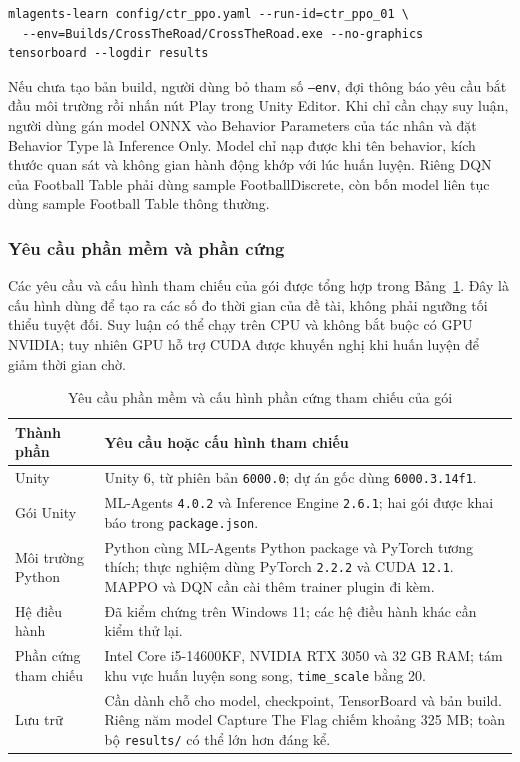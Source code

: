 \begin{lstlisting}[caption={Lệnh mẫu huấn luyện môi trường Cross The Road}]
mlagents-learn config/ctr_ppo.yaml --run-id=ctr_ppo_01 \
  --env=Builds/CrossTheRoad/CrossTheRoad.exe --no-graphics
tensorboard --logdir results
\end{lstlisting}

\indent Nếu chưa tạo bản build, người dùng bỏ tham số \texttt{--env}, đợi thông báo yêu
cầu bắt đầu môi trường rồi nhấn nút Play trong Unity Editor. Khi chỉ cần chạy suy luận,
người dùng gán model ONNX vào Behavior Parameters của tác nhân và đặt
Behavior Type là Inference Only. Model chỉ nạp được khi tên behavior,
kích thước quan sát và không gian hành động khớp với lúc huấn luyện. Riêng DQN của
Football Table phải dùng sample FootballDiscrete, còn bốn model liên tục dùng
sample Football Table thông thường.

\subsubsection{Yêu cầu phần mềm và phần cứng}
\label{subsub:pkg-requirements}

\indent Các yêu cầu và cấu hình tham chiếu của gói được tổng hợp trong
Bảng~\ref{tab:pkg_requirements}. Đây là cấu hình dùng để tạo ra các số đo thời gian của
đề tài, không phải ngưỡng tối thiểu tuyệt đối. Suy luận có thể chạy trên CPU và không bắt
buộc có GPU NVIDIA; tuy nhiên GPU hỗ trợ CUDA được khuyến nghị khi huấn luyện để giảm thời
gian chờ.

\begin{table}[H]
\centering
\caption{Yêu cầu phần mềm và cấu hình phần cứng tham chiếu của gói}
\label{tab:pkg_requirements}
\renewcommand{\arraystretch}{1.3}
\tablefont
\begin{tabular}{|p{3.7cm}|>{\raggedright\arraybackslash}p{9.8cm}|}
\hline
\textbf{Thành phần} & \textbf{Yêu cầu hoặc cấu hình tham chiếu} \\
\hline
Unity & Unity 6, từ phiên bản \texttt{6000.0}; dự án gốc dùng
\texttt{6000.3.14f1}. \\
\hline
Gói Unity & ML-Agents \texttt{4.0.2} và Inference Engine \texttt{2.6.1}; hai gói được
khai báo trong \texttt{package.json}. \\
\hline
Môi trường Python & Python cùng ML-Agents Python package và PyTorch tương thích; thực
nghiệm dùng PyTorch \texttt{2.2.2} và CUDA \texttt{12.1}. MAPPO và DQN cần cài thêm
trainer plugin đi kèm. \\
\hline
Hệ điều hành & Đã kiểm chứng trên Windows 11; các hệ điều hành khác cần kiểm thử lại. \\
\hline
Phần cứng tham chiếu & Intel Core i5-14600KF, NVIDIA RTX 3050 và 32 GB RAM; tám khu vực
huấn luyện song song, \texttt{time\_scale} bằng 20. \\
\hline
Lưu trữ & Cần dành chỗ cho model, checkpoint, TensorBoard và bản build. Riêng năm model
Capture The Flag chiếm khoảng 325 MB; toàn bộ \texttt{results/} có thể lớn hơn đáng kể. \\
\hline
\end{tabular}
\end{table}

